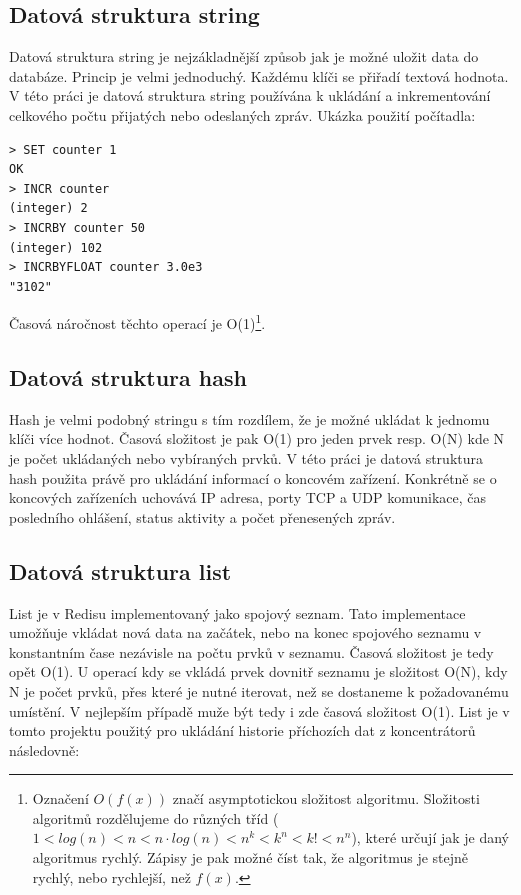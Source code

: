 \subsection{Datová struktura string}
Datová struktura string je nejzákladnější způsob jak je možné uložit data do databáze. Princip je velmi jednoduchý. Každému klíči se přiřadí textová hodnota. V této práci je datová struktura string používána k ukládání a inkrementování celkového počtu přijatých nebo odeslaných zpráv. Ukázka použití počítadla:

\begin{verbatim}
> SET counter 1
OK
> INCR counter
(integer) 2
> INCRBY counter 50
(integer) 102
> INCRBYFLOAT counter 3.0e3
"3102"
\end{verbatim}

Časová náročnost těchto operací je O(1)\footnote{Označení $O(f(x))$ značí asymptotickou složitost algoritmu. Složitosti algoritmů rozdělujeme do různých tříd ($1 < log(n) < n < n\cdot log(n) < n^k < k^n < k! < n^n$), které určují jak je daný algoritmus rychlý. Zápisy je pak možné číst tak, že algoritmus je stejně rychlý, nebo rychlejší, než $f(x)$.}.

\subsection{Datová struktura hash}
Hash je velmi podobný stringu s tím rozdílem, že je možné ukládat k jednomu klíči více hodnot. Časová složitost je pak O(1) pro jeden prvek resp. O(N) kde N je počet ukládaných nebo vybíraných prvků. V této práci je datová struktura hash použita právě pro ukládání informací o koncovém zařízení. Konkrétně se o koncových zařízeních uchovává IP adresa, porty TCP a UDP komunikace, čas posledního ohlášení, status aktivity a počet přenesených zpráv.

\subsection{Datová struktura list}
List je v Redisu implementovaný jako spojový seznam. Tato implementace umožňuje vkládat nová data na začátek, nebo na konec spojového seznamu v konstantním čase nezávisle na počtu prvků v seznamu. Časová složitost je tedy opět O(1). U operací kdy se vkládá prvek dovnitř seznamu je složitost O(N), kdy N je počet prvků, přes které je nutné iterovat, než se dostaneme k požadovanému umístění. V nejlepším případě muže být tedy i zde časová složitost O(1). List je v tomto projektu použitý pro ukládání historie příchozích dat z koncentrátorů následovně:

